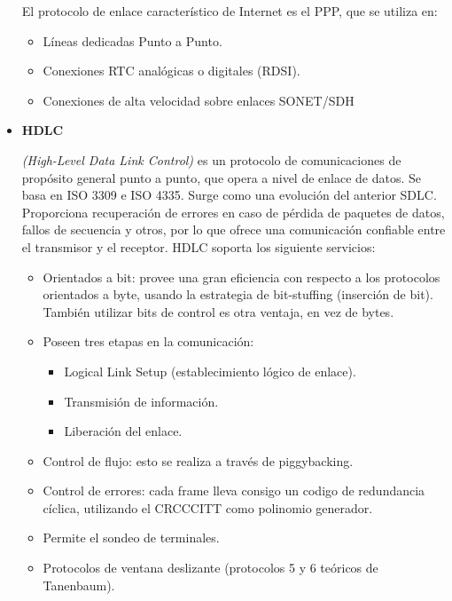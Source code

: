 \documentclass[a4paper,12pt]{article}
\begin{document}
\begin{itemize}
 El protocolo de enlace característico de Internet es el PPP, que se utiliza en:
 
 \begin{itemize}
  \item Líneas dedicadas Punto a Punto.
  \item Conexiones RTC analógicas o digitales (RDSI).
  \item Conexiones de alta velocidad sobre enlaces SONET/SDH
 \end{itemize}

 \item \textbf{HDLC}
 
 \textit{(High-Level Data Link Control)} es un protocolo de comunicaciones de propósito general punto a punto, que opera a nivel de enlace de datos. 
 Se basa en ISO 3309 e ISO 4335. Surge como una evolución del anterior SDLC. Proporciona recuperación de errores en caso de pérdida de paquetes de datos, 
 fallos de secuencia y otros, por lo que ofrece una comunicación confiable entre el transmisor y el receptor.
 HDLC soporta los siguiente servicios:
 
 \begin{itemize}
  \item Orientados a bit: provee una gran eficiencia con respecto a los protocolos orientados a byte, 
  usando la estrategia de bit-stuffing (inserción de bit). También utilizar bits de control es otra
  ventaja, en vez de bytes.
  \item Poseen tres etapas en la comunicación:
  \begin{itemize}
   \item Logical Link Setup (establecimiento lógico de enlace).
   \item Transmisión de información.
   \item Liberación del enlace.
  \end{itemize}
  \item Control de flujo: esto se realiza a través de piggybacking.
  \item Control de errores: cada frame lleva consigo un codigo de redundancia cíclica, utilizando el CRCCCITT como polinomio generador.
  \item Permite el sondeo de terminales.
  \item Protocolos de ventana deslizante (protocolos 5 y 6 teóricos de Tanenbaum).
  \end{itemize}
  

\end{itemize}
\end{document}
